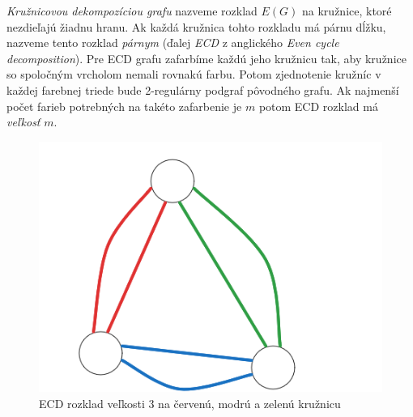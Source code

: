 \documentclass[11pt]{article}
\begin{document}
\textit{Kružnicovou dekompozíciou grafu} nazveme rozklad $E(G)$ na kružnice, ktoré nezdieľajú žiadnu
hranu. Ak každá kružnica tohto rozkladu má párnu dĺžku, nazveme tento rozklad \textit{párnym} (ďalej
\textit{ECD} z anglického \textit{Even cycle decomposition}).
Pre ECD grafu zafarbíme každú jeho kružnicu tak, aby kružnice so spoločným
vrcholom nemali rovnakú farbu. Potom zjednotenie kružníc v každej farebnej triede 
bude 2-regulárny podgraf pôvodného grafu. Ak najmenší počet farieb potrebných 
na takéto zafarbenie je $m$ potom ECD rozklad má \textit{veľkosť} $m$. \cite{MALNEGRO2024113844}

\begin{figure}[h]
    \includegraphics[scale=0.4]{TexResources/2c3ecd}
    \centering
    \caption{ECD rozklad veľkosti 3 na červenú, modrú a zelenú kružnicu}
\end{figure}
\printbibliography
\end{document}
